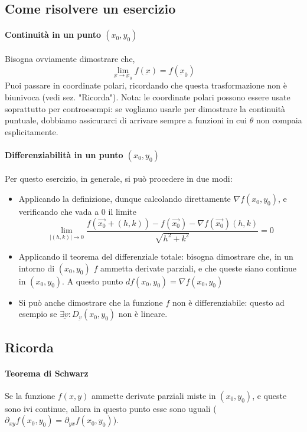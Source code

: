 \documentclass[a4paper,12pt]{book}
\newcommand{\ubar}{\underbar}
\begin{document}
\subsection{Come risolvere un esercizio}
\paragraph{Continuità in un punto $(x_0, y_0)$}

Bisogna ovviamente dimostrare che, $$\lim_{\ubar{x}\rightarrow\ubar{x}_0}\ubar{f}(\ubar{x}) = \ubar{f}(\ubar{x}_0)$$
Puoi passare in coordinate polari, ricordando che questa trasformazione non è biunivoca (vedi sez. "Ricorda"). Nota: le coordinate polari possono essere usate soprattutto per controesempi: se vogliamo usarle per dimostrare la continuità puntuale, dobbiamo assicurarci di arrivare sempre a funzioni in cui $\theta$ non compaia esplicitamente.

\paragraph{Differenziabilità in un punto $(x_0, y_0)$}
Per questo esercizio, in generale, si può procedere in due modi:
\begin{itemize}
 \item Applicando la definizione, dunque calcolando direttamente $\nabla f(x_0, y_0)$, e verificando che vada a 0 il limite
 $$\lim_{|(h, k)| \to 0} \dfrac{f(\vec{x_0}+(h, k)) - f(\vec{x_0}) - \nabla f(\vec{x_0})(h, k)}{\sqrt{h^2+k^2}} = 0 $$
 \item Applicando il teorema del differenziale totale: bisogna dimostrare che, in un intorno di $(x_0, y_0)$ $f$ ammetta derivate parziali, e che queste siano continue in $(x_0, y_0)$. A questo punto $df(x_0, y_0) = \nabla f(x_0, y_0)$
 \item Si può anche dimostrare che la funzione $f$ non è differenziabile: questo ad esempio se $\exists \underbar{v}: D_{\underbar{v}}(x_0, y_0)$ non è lineare.
\end{itemize}

\subsection{Ricorda}
\paragraph{Teorema di Schwarz}
Se la funzione $f(x,y)$ ammette derivate parziali miste in $(x_0, y_0)$, e queste sono ivi continue, allora in questo punto esse sono uguali ($\partial_{xy}f(x_0, y_0) = \partial_{yx}f(x_0, y_0)$).
\end{document}
